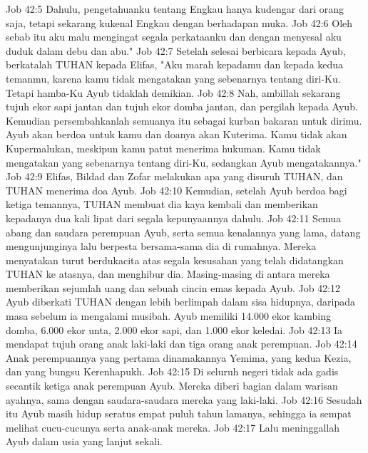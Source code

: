 Job 42:5  Dahulu, pengetahuanku tentang Engkau hanya kudengar dari orang saja, tetapi sekarang kukenal Engkau dengan berhadapan muka.
Job 42:6  Oleh sebab itu aku malu mengingat segala perkataanku dan dengan menyesal aku duduk dalam debu dan abu."
Job 42:7  Setelah selesai berbicara kepada Ayub, berkatalah TUHAN kepada Elifas, "Aku marah kepadamu dan kepada kedua temanmu, karena kamu tidak mengatakan yang sebenarnya tentang diri-Ku. Tetapi hamba-Ku Ayub tidaklah demikian.
Job 42:8  Nah, ambillah sekarang tujuh ekor sapi jantan dan tujuh ekor domba jantan, dan pergilah kepada Ayub. Kemudian persembahkanlah semuanya itu sebagai kurban bakaran untuk dirimu. Ayub akan berdoa untuk kamu dan doanya akan Kuterima. Kamu tidak akan Kupermalukan, meskipun kamu patut menerima hukuman. Kamu tidak mengatakan yang sebenarnya tentang diri-Ku, sedangkan Ayub mengatakannya."
Job 42:9  Elifas, Bildad dan Zofar melakukan apa yang disuruh TUHAN, dan TUHAN menerima doa Ayub.
Job 42:10  Kemudian, setelah Ayub berdoa bagi ketiga temannya, TUHAN membuat dia kaya kembali dan memberikan kepadanya dua kali lipat dari segala kepunyaannya dahulu.
Job 42:11  Semua abang dan saudara perempuan Ayub, serta semua kenalannya yang lama, datang mengunjunginya lalu berpesta bersama-sama dia di rumahnya. Mereka menyatakan turut berdukacita atas segala kesusahan yang telah didatangkan TUHAN ke atasnya, dan menghibur dia. Masing-masing di antara mereka memberikan sejumlah uang dan sebuah cincin emas kepada Ayub.
Job 42:12  Ayub diberkati TUHAN dengan lebih berlimpah dalam sisa hidupnya, daripada masa sebelum ia mengalami musibah. Ayub memiliki 14.000 ekor kambing domba, 6.000 ekor unta, 2.000 ekor sapi, dan 1.000 ekor keledai.
Job 42:13  Ia mendapat tujuh orang anak laki-laki dan tiga orang anak perempuan.
Job 42:14  Anak perempuannya yang pertama dinamakannya Yemima, yang kedua Kezia, dan yang bungsu Kerenhapukh.
Job 42:15  Di seluruh negeri tidak ada gadis secantik ketiga anak perempuan Ayub. Mereka diberi bagian dalam warisan ayahnya, sama dengan saudara-saudara mereka yang laki-laki.
Job 42:16  Sesudah itu Ayub masih hidup seratus empat puluh tahun lamanya, sehingga ia sempat melihat cucu-cucunya serta anak-anak mereka.
Job 42:17  Lalu meninggallah Ayub dalam usia yang lanjut sekali.


